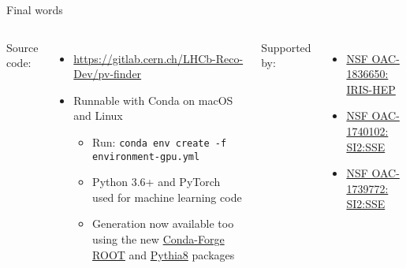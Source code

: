 \begin{frame}{Final words}


\vspace{1cm}
\begin{columns}[t]
    Source code:
    \begin{itemize}
        \item \url{https://gitlab.cern.ch/LHCb-Reco-Dev/pv-finder}
        \item Runnable with Conda on macOS and Linux
        \begin{itemize}
            \item Run: \texttt{conda env create -f environment-gpu.yml}
            \item Python 3.6+ and PyTorch used for machine learning code
            \item Generation now available too using the new \href{https://github.com/conda-forge/root-feedstock}{Conda-Forge ROOT} and \href{https://github.com/conda-forge/pythia8-feedstock}{Pythia8} packages
        \end{itemize}
    \end{itemize}

	Supported by:
	\begin{itemize}
		\item \href{https://www.nsf.gov/awardsearch/showAward?AWD_ID=1836650}{NSF OAC-1836650: IRIS-HEP}
		\item \href{https://www.nsf.gov/awardsearch/showAward?AWD_ID=1740102}{NSF OAC-1740102: SI2:SSE}
		\item \href{https://www.nsf.gov/awardsearch/showAward?AWD_ID=1739772}{NSF OAC-1739772: SI2:SSE}
	\end{itemize}
\end{columns}


\end{frame}
